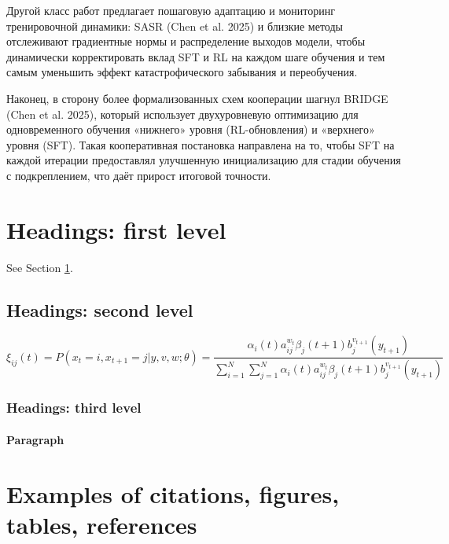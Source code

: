 \documentclass{article}
\begin{document}
Другой класс работ предлагает пошаговую адаптацию и мониторинг тренировочной динамики: SASR (Chen et al. 2025) и близкие методы отслеживают градиентные нормы и распределение выходов модели, чтобы динамически корректировать вклад SFT и RL на каждом шаге обучения и тем самым уменьшить эффект катастрофического забывания и переобучения.

Наконец, в сторону более формализованных схем кооперации шагнул BRIDGE (Chen et al. 2025), который использует двухуровневую оптимизацию для одновременного обучения «нижнего» уровня (RL-обновления) и «верхнего» уровня (SFT). Такая кооперативная постановка направлена на то, чтобы SFT на каждой итерации предоставлял улучшенную инициализацию для стадии обучения с подкреплением, что даёт прирост итоговой точности.



\section{Headings: first level}
\label{sec:headings}

\lipsum[4] See Section \ref{sec:headings}.

\subsection{Headings: second level}
\lipsum[5]
\begin{equation}
	\xi _{ij}(t)=P(x_{t}=i,x_{t+1}=j|y,v,w;\theta)= {\frac {\alpha _{i}(t)a^{w_t}_{ij}\beta _{j}(t+1)b^{v_{t+1}}_{j}(y_{t+1})}{\sum _{i=1}^{N} \sum _{j=1}^{N} \alpha _{i}(t)a^{w_t}_{ij}\beta _{j}(t+1)b^{v_{t+1}}_{j}(y_{t+1})}}
\end{equation}

\subsubsection{Headings: third level}
\lipsum[6]

\paragraph{Paragraph}
\lipsum[7]



\section{Examples of citations, figures, tables, references}
\label{sec:others}
\end{document}
